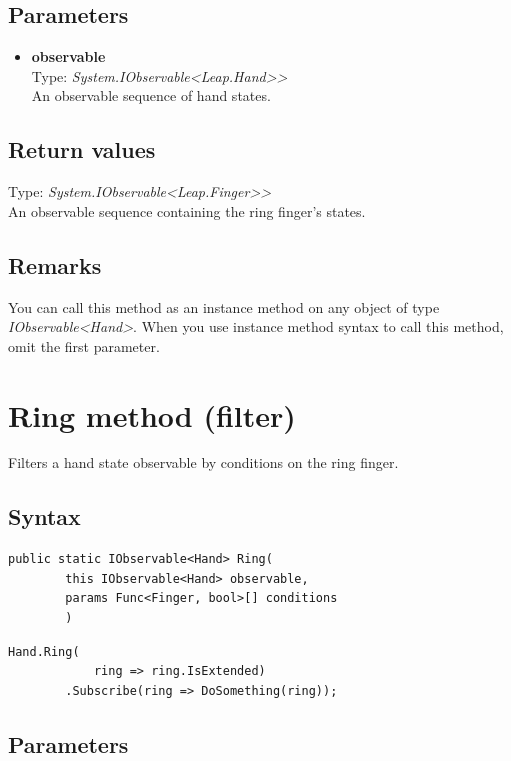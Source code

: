 \documentclass[12pt,a4paper,twoside]{report}
\begin{document}
\subsection{Parameters}
\begin{itemize}
    \item \textbf{observable}\\
    Type: \textit{System.IObservable<Leap.Hand>{}>}\\
    An observable sequence of hand states.
\end{itemize}

\subsection{Return values}
Type: \textit{System.IObservable<Leap.Finger>{}>}\\

An observable sequence containing the ring finger's states.

\subsection{Remarks}
You can call this method as an instance method on any object of type \textit{IObservable<Hand>}. When you use 
instance method syntax to call this method, omit the first parameter.

\newpage

\section{Ring method (filter)}
Filters a hand state observable by conditions on the ring finger.

\subsection{Syntax}
\begin{lstlisting}[caption=Declaration]
    public static IObservable<Hand> Ring(
        this IObservable<Hand> observable,
        params Func<Finger, bool>[] conditions
        )
\end{lstlisting}

\begin{lstlisting}[caption=Usage example]
    Hand.Ring(
            ring => ring.IsExtended)
        .Subscribe(ring => DoSomething(ring));
\end{lstlisting}

\subsection{Parameters}
\end{document}
